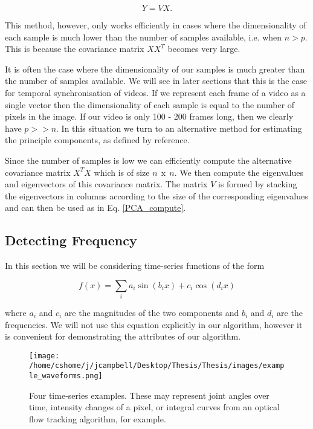 \begin{equation}
Y = V X. 
\label{PCA_compute}
\end{equation}

This method, however, only works efficiently in cases where the dimensionality of each sample is much lower than the number of samples available, i.e. when $n > p$. This is because the covariance matrix $X X^{T}$ becomes very large. 

It is often the case where the dimensionality of our samples is much greater than the number of samples available. We will see in later sections that this is the case for temporal synchronisation of videos. If we represent each frame of a video as a single vector then the dimensionality of each sample is equal to the number of pixels in the image. If our video is only 100 - 200 frames long, then we clearly have $p >> n$. In this situation we turn to an alternative method for estimating the principle components, as defined by reference. 

Since the number of samples is low we can efficiently compute the alternative covariance matrix $X^{T} X$ which is of size $n\:\:\text{x}\:\:n$. We then compute the eigenvalues and eigenvectors of this covariance matrix. The matrix $V$ is formed by stacking the eigenvectors in columns according to the size of the corresponding eigenvalues and can then be used as in Eq. \ref{PCA_compute}.

\subsection{Detecting Frequency}

In this section we will be considering time-series functions of the form

\begin{equation}
f(x) = \sum_i{a_i\sin(b_ix) + c_i\cos(d_ix)}
\end{equation}

\noindent where $a_i$ and $c_i$ are the magnitudes of the two components and $b_i$ and $d_i$ are the frequencies. We will not use this equation explicitly in our algorithm, however it is convenient for demonstrating the attributes of our algorithm.

\begin{figure}[h]
\texttt{[image: /home/cshome/j/jcampbell/Desktop/Thesis/Thesis/images/example\_waveforms.png]}
\caption{Four time-series examples. These may represent joint angles over time, intensity changes of a pixel, or integral curves from an optical flow tracking algorithm, for example. \label{example_waveforms}}
\end{figure}

